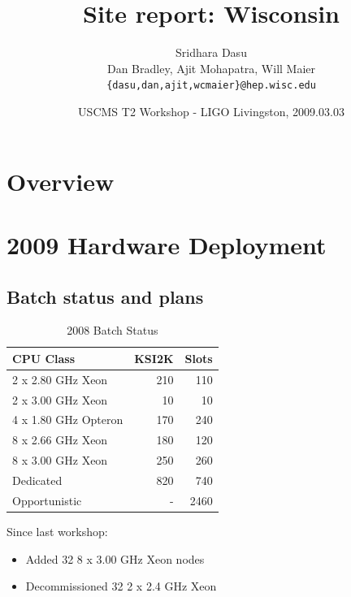 \documentclass{beamer}
\title{Site report: Wisconsin}
\author[Maier]{
    Sridhara Dasu \\
    Dan Bradley, Ajit Mohapatra, Will Maier
    {\tt \{dasu,dan,ajit,wcmaier\}@hep.wisc.edu}}
\institute[Wisconsin]{University of Wisconsin - High Energy Physics}
\date[2009.03.03]{USCMS T2 Workshop - LIGO Livingston, 2009.03.03}
\begin{document}

\begin{frame}
    \titlepage
\end{frame}

\section{Overview}
\begin{frame}
    \tableofcontents
\end{frame}

\section{2009 Hardware Deployment}
\subsection{Batch status and plans}
\begin{frame}
\begin{table}
\begin{tabular}{lrr}
    \toprule
    CPU Class               &   KSI2K   &   Slots \\
    \midrule
    2 x 2.80 GHz Xeon       &   210     &   110 \\  %
    2 x 3.00 GHz Xeon       &   10      &   10 \\   %
    4 x 1.80 GHz Opteron    &   170     &   240 \\  %
    8 x 2.66 GHz Xeon       &   180     &   120 \\  %
    8 x 3.00 GHz Xeon       &   250     &   260 \\  %
    \midrule
    Dedicated               &   820     &   740 \\
    Opportunistic           &   -       &   2460 \\
    \bottomrule
\end{tabular}
\caption{2008 Batch Status}
\label{2008_batch_status}
\end{table}

Since last workshop:
\begin{itemize}
    \item Added 32 8 x 3.00 GHz Xeon nodes
    \item Decommissioned 32 2 x 2.4 GHz Xeon
\end{itemize}
\end{frame}
\end{document}
